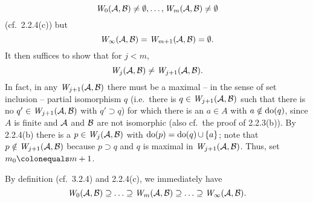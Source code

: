 \begin{enumerate}[1.]
\[
\winpos{0}(\strct{A}, \strct{B}) \neq \emptyset, \etc, \winpos{m}(\strct{A}, \strct{B}) \neq \emptyset
\]
(cf.\ 2.2.4(c)) but
\[
\winpos{\infty}(\strct{A}, \strct{B}) = \winpos{m + 1}(\strct{A}, \strct{B}) = \emptyset.
\]
It then suffices to show that for $j < m$, 
\[
\winpos{j}(\strct{A}, \strct{B}) \neq \winpos{j + 1}(\strct{A}, \strct{B}).
\]
In fact, in any $\winpos{j + 1}(\strct{A}, \strct{B})$ there must be a maximal -- in the sense of set inclusion -- partial isomorphism $q$ (i.e.\ there is $q \in \winpos{j + 1}(\strct{A}, \strct{B})$ such that there is no $q' \in \winpos{j + 1}(\strct{A}, \strct{B})$ with $q' \supset q$) for which there is an $a \in A$ with $a \notin \mathrm{do}(q)$, since $A$ is finite and $\mathcal{A}$ and $\mathcal{B}$ are not isomorphic (also cf.\ the proof of 2.2.3(b)). By 2.2.4(b) there is a $p \in \winpos{j}(\strct{A}, \strct{B})$ with $\mathrm{do}(p) = \mathrm{do}(q) \mathop{\cup} {\{a\}}$; note that $p \notin \winpos{j + 1}(\strct{A}, \strct{B})$ because $p \supset q$ and $q$ is maximal in $\winpos{j + 1}(\strct{A}, \strct{B})$. Thus, set $m_0 \defas m + 1$.
\begin{remark}
By definition (cf.\ 3.2.4) and 2.2.4(c), we immediately have
\[
\winpos{0}(\strct{A}, \strct{B}) \supseteq \etc \supseteq \winpos{m}(\strct{A}, \strct{B}) \supseteq \etc \supseteq \winpos{\infty}(\strct{A}, \strct{B}).
\]
\end{remark}
%
\end{enumerate}


